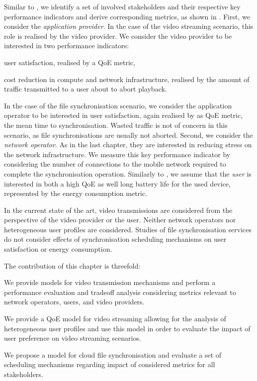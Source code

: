Similar to , we identify a set of involved stakeholders and their respective key performance indicators and derive corresponding metrics, as shown in .
First, we consider the \emph{application provider}. 
In the case of the video streaming scenario, this role is realised by the video provider.
We consider the video provider to be interested in two performance indicators: 
\begin{enumerate*}
\item user satisfaction, realised by a \gls{QoE} metric,
\item cost reduction in compute and network infrastructure, realised by the amount of traffic transmitted to a user about to abort playback.
\end{enumerate*}
In the case of the file synchronisation scenario, we consider the application operator to be interested in user satisfaction, again realised by as \gls{QoE} metric, the mean time to synchronisation.
Wasted traffic is not of concern in this scenario, as file synchronisations are usually not aborted.
Second, we consider the \emph{network operator}.
As in the last chapter, they are interested in reducing stress on the network infrastructure.
We measure this key performance indicator by considering the number of connections to the mobile network required to complete the synchronisation operation.
Similarly to , we assume that the \emph{user} is interested in both a high \gls{QoE} as well long battery life for the used device, represented by the energy consumption metric. 

In the current state of the art, video transmissions are considered from the perspective of the video provider or the user. 
Neither network operators nor heterogeneous user profiles are considered.
Studies of file synchronisation services do not consider effects of synchronisation scheduling mechanisms on user satisfaction or energy consumption.  

The contribution of this chapter is threefold:
\begin{enumerate*}
\item We provide models for video transmission mechanisms and perform a performance evaluation and tradeoff analysis considering metrics relevant to network operators, users, and video providers.
\item We provide a \gls{QoE} model for video streaming allowing for the analysis of heterogeneous user profiles and use this model in order to evaluate the impact of user preference on video streaming scenarios.
\item We propose a model for cloud file synchronisation and evaluate a set of scheduling mechanisms regarding impact of considered metrics for all stakeholders.
\end{enumerate*}

